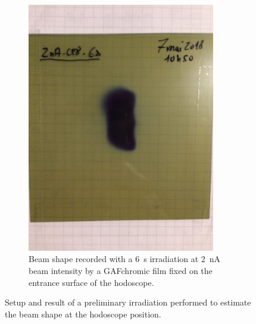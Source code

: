 \begin{figure}
\begin{subfigure}[t]{.5\textwidth}
\includegraphics[width=0.9\textwidth]{03_GraphicFiles/chapter6_BeamTests/Nice_May2018/IMG_5849.JPG}	
\caption{Beam shape recorded with a 6~s irradiation at 2~nA beam intensity by a GAFchromic film fixed on the entrance surface of the hodoscope.}
\label{chap6::fig::May_HodoFilmBeam}
\end{subfigure}
\caption{Setup and result of a preliminary irradiation performed to estimate the beam shape at the hodoscope position.}
\label{chap6::fig::May_HodoGAFChrom}
\end{figure}

